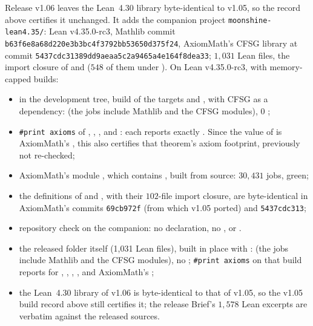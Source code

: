 \begin{status}[title={The release build of v1.06 (library on Lean v4.30.0; companion on Lean v4.35.0-rc3)}]
Release v1.06 leaves the Lean~4.30 library byte-identical to v1.05, so the record above certifies it unchanged. It adds
the companion project \texttt{moonshine-lean4.35/}: Lean v4.35.0-rc3, Mathlib commit
\texttt{b63f6e8a68d220e3b3bc4f3792bb53650d375f24}, AxiomMath's CFSG library at commit
\texttt{5437cdc31389dd9aeaa5c2a9465a4e164f8dea33}; $1{,}031$ Lean files, the import closure of  and
 ($548$ of them under ). On Lean v4.35.0-rc3, with
memory-capped builds:
\begin{itemize}
\item in the development tree, build of the targets  and
  , with CFSG as a dependency:  (the jobs include Mathlib and the CFSG modules), 0
  ;
\item \texttt{\#print axioms} of , , ,
   and : each reports exactly
  . Since the value of  is AxiomMath's
  , this also certifies that theorem's axiom footprint, previously not re-checked;
\item AxiomMath's module , which contains , built
  from source: $30{,}431$ jobs, green;
\item the definitions of  and , with their $102$-file import closure, are byte-identical in
  AxiomMath's commits \texttt{69cb972f} (from which v1.05 ported) and \texttt{5437cdc313};
\item repository check on the companion: no  declaration, no ,  or
  .
\item the released folder  itself (1{,}031 Lean files), built in place with
  :  (the jobs include Mathlib and the CFSG modules), no
  ; \texttt{\#print axioms} on that build reports  for
  , , ,
  ,  and AxiomMath's
  ;
\item the Lean~4.30 library of v1.06 is byte-identical to that of v1.05, so the v1.05 build record above still
  certifies it; the release Brief's $1{,}578$ Lean excerpts are verbatim against the released sources.
\end{itemize}
\end{status}

